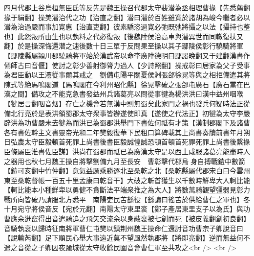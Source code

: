四月代郡上谷烏桓無臣氐等反先是魏王操召代郡太守裴潜為丞相理曹掾【先悉薦翻掾于絹翻】操美潜治代之功【治直之翻】潜曰潜於百姓雖寛於諸胡為峻今繼者必以潜為治過嚴而事加寛惠【治直吏翻】彼素驕恣過寛必弛既弛將攝之以法【攝持也整也】此怨叛所由生也以埶料之代必復叛【後魏陸侯治高車與潜異世而同轍復扶又翻】於是操深悔還潜之速後數十日三單于反問果至操以其子鄢陵侯彰行驍騎將軍【鄢陵縣屬潁川郡驍騎將軍始於漢武帝以命李廣陸德明曰鄢謁晩翻又于建翻漢書作傿師古曰音偃】使討之彰少善射御膂力過人【少詩照翻】操戒彰曰居家為父子受事為君臣動以王灋從事爾其戒之　劉備屯陽平關夏侯淵張郃徐晃等與之相拒備遣其將陳式等絶馬鳴閣道【馬鳴閣在今利州昭化縣】徐晃擊破之張郃屯廣石【廣石當在巴漢之間】備攻之不能克急書發益州兵諸葛亮以問從事犍為楊洪洪曰漢中益州咽喉【犍居言翻咽音烟】存亡之機會若無漢中則無蜀矣此家門之禍也發兵何疑時法正從備北行亮於是表洪領蜀郡太守衆事皆辦遂使即真【遂使之代法正】初犍為太守李嚴辟洪為功曹嚴未去犍為而洪已為蜀郡洪舉門下書佐何祗有才策【漢制郡閣下及諸曹各有書佐幹主文書靈帝光和二年樊毅復華下民租口算碑載其上尚書奏牘前書年月朔日弘農太守臣毅頓首死罪上尚書後書臣毅誠惶誠恐頓首頓首死罪死罪上尚書後繫掾臣條屬臣淮書佐臣謀】洪尚在蜀郡而祗已為廣漢太守是以西土咸服諸葛亮能盡時人之器用也秋七月魏王操自將擊劉備九月至長安　曹彰擊代郡烏身自搏戰鎧中數箭【鎧可亥翻中竹仲翻】意氣益厲乘勝逐北至桑乾之北【桑乾縣屬代郡宋白曰今雲州東至桑乾督帳一百五十里孟康曰乾音干】大破之斬首獲生以千數時鮮卑大人軻比能【軻比能本小種鮮卑以勇健不貪斷法平端衆推之為大人】將數萬騎觀望彊弱見彰力戰所向皆破乃請服北方悉平　南陽吏民苦繇役【繇讀曰徭苦於供給曹仁之軍也】冬十月宛守將侯音反【宛於元翻】南陽太守東里衮【鄭子產居東里支子以為氏】與功曹應余迸竄得出音遣騎追之飛矢交流余以身蔽衮被七創而死【被皮義翻創初良翻】音騎執衮以歸時征南將軍曹仁屯樊以鎮荆州魏王操命仁還討音功曹宗子卿說音曰【說輸芮翻】足下順民心舉大事遠近莫不望風然執郡將【將即亮翻】逆而無益何不遣之音從之子卿因夜踰城從太守收餘民圍音會曹仁軍至共攻之<br />
<br />
